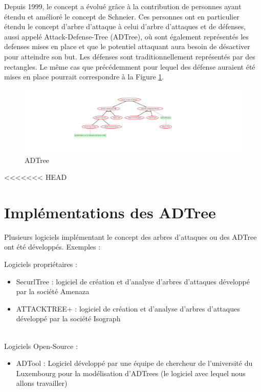 		Depuis 1999, le concept a évolué grâce à la contribution de personnes ayant étendu et amélioré le concept de Schneier. Ces personnes ont en particulier étendu le concept d'arbre d'attaque à celui d'arbre d'attaques et de défenses, aussi appelé Attack-Defense-Tree (ADTree), où sont également représentés les defenses mises en place et que le potentiel attaquant aura besoin de désactiver pour atteindre son but. Les défenses sont traditionnellement représentés par des rectangles. Le même cas que précédemment pour lequel des défense auraient été mises en place pourrait correspondre à la Figure \ref{fig:arbre_exemple_2}.

        \begin{figure}[h!]
            \begin{center}
                \includegraphics[width=1\textwidth]{figure/exemple2_rapport.png}
            \end{center}
            \caption{ADTree}
            \label{fig:arbre_exemple_2}
        \end{figure}

<<<<<<< HEAD
	\section{Implémentations des ADTree}
		Plusieurs logiciels implémentant le concept des arbres d'attaques ou des ADTree ont été développés. Exemples :
        
        {\large Logiciels propriétaires :}
        \begin{itemize}
            \item SecurlTree : logiciel de création et d'analyse d'arbres d'attaques développé par la société Amenaza
            \item ATTACKTREE+ : logiciel de création et d'analyse d'arbres d'attaques développé par la société Isograph
        \end{itemize}
        ~~\\
        {\large Logiciels Open-Source :}
        \begin{itemize}
            \item ADTool : Logiciel développé par une équipe de chercheur de l'université du Luxembourg pour la modélisation d'ADTrees (le logiciel avec lequel nous allons travailler)
        \end{itemize}
~~

